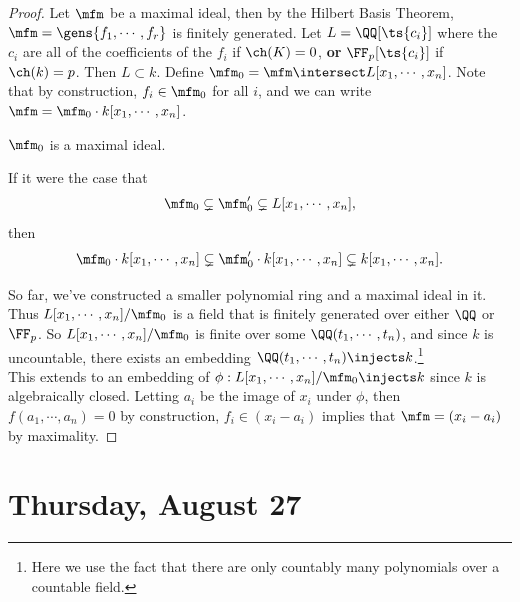 \begin{proof}

Let \(\mfm\) be a maximal ideal, then by the Hilbert Basis Theorem,
\(\mfm = \gens{f_1, \cdots, f_r}\) is finitely generated. Let
\(L = \QQ[\ts {c_i}]\) where the \(c_i\) are all of the coefficients of
the \(f_i\) if \(\ch(K) = 0\), \textbf{or} \(\FF_p[\ts {c_i}]\) if
\(\ch(k) = p\). Then \(L\subset k\). Define
\(\mfm_0 = \mfm\intersect L[x_1, \cdots, x_n]\). Note that by
construction, \(f_i \in \mfm_0\) for all \(i\), and we can write
\(\mfm = \mfm_0 \cdot k[x_1, \cdots, x_n]\).

\begin{claim}

\(\mfm_0\) is a maximal ideal.

\end{claim}

If it were the case that
\begin{align*}  
\mfm_0 \subsetneq \mfm_0' \subsetneq L[x_1, \cdots, x_n]
,\end{align*} then
\begin{align*}  
\mfm_0\cdot k[x_1, \cdots, x_n] \subsetneq \mfm_0'\cdot k[x_1, \cdots, x_n]  \subsetneq k[x_1, \cdots, x_n]
.\end{align*}

So far, we've constructed a smaller polynomial ring and a maximal ideal
in it. Thus \(L[x_1, \cdots, x_n]/\mfm_0\) is a field that is finitely
generated over either \(\QQ\) or \(\FF_p\). So
\(L[x_1, \cdots, x_n]/\mfm_0\) is finite over some
\(\QQ(t_1, \cdots, t_n)\), and since \(k\) is uncountable, there exists
an embedding \(\QQ(t_1, \cdots, t_n) \injects k\).\footnote{Here we use
  the fact that there are only countably many polynomials over a
  countable field.}\\

This extends to an embedding of
\(\phi: L[x_1, \cdots, x_n]/\mfm_0 \injects k\) since \(k\) is
algebraically closed. Letting \(a_i\) be the image of \(x_i\) under
\(\phi\), then \(f(a_1, \cdots, a_n) = 0\) by construction,
\(f_i \in (x_i - a_i)\) implies that \(\mfm = (x_i - a_i)\) by
maximality.

\end{proof}

\hypertarget{thursday-august-27}{%
\section{Thursday, August 27}\label{thursday-august-27}}

